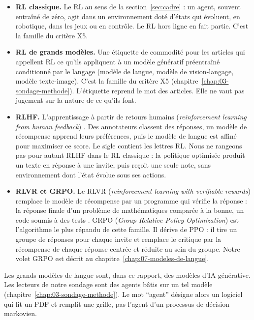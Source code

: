 \begin{itemize}
  \item \textbf{RL classique.} Le RL au sens de la section~\ref{sec:cadre} : un agent, souvent entraîné de
  zéro, agit dans un environnement doté d'états qui évoluent, en robotique, dans les jeux ou en
  contrôle. Le RL hors ligne en fait partie. C'est la famille  du critère X5.
  \item \textbf{RL de grands modèles.} Une étiquette de commodité pour les articles qui appellent RL ce
  qu'ils appliquent à un modèle génératif préentraîné conditionné par le langage (modèle de langue,
  modèle de vision-langage, modèle texte-image). C'est la famille  du critère X5
  (chapitre~\ref{chap:03-sondage-methode}). L'étiquette reprend le mot des articles. Elle ne vaut pas jugement
  sur la nature de ce qu'ils font.
  \item \textbf{RLHF.} L'apprentissage à partir de retours humains (\emph{reinforcement learning from
  human feedback}) \parencite{christiano2017deep,ouyang2022instructgpt}. Des annotateurs classent des
  réponses, un modèle de récompense apprend leurs préférences, puis le modèle de langue est affiné pour
  maximiser ce score. Le sigle contient les lettres RL. Nous ne rangeons pas pour autant RLHF dans
  le RL classique : la politique optimisée produit un texte en réponse à une invite, puis reçoit une seule note,
  sans environnement dont l'état évolue sous ses actions.
  \item \textbf{RLVR et GRPO.} Le RLVR (\emph{reinforcement learning with verifiable rewards}) remplace
  le modèle de récompense par un programme qui vérifie la réponse : la réponse finale d'un problème de
  mathématiques comparée à la bonne, un code soumis à des tests \parencite{deepseek2025r1}. GRPO
  (\emph{Group Relative Policy Optimization}) \parencite{shao2024deepseekmath} est l'algorithme le plus
  répandu de cette famille. Il dérive de PPO : il tire un groupe de réponses pour chaque invite et
  remplace le critique par la récompense de chaque réponse centrée et réduite au sein du groupe. Notre
  volet GRPO est décrit au chapitre~\ref{chap:07-modeles-de-langue}.
\end{itemize}

Les grands modèles de langue sont, dans ce rapport, des modèles d'IA générative. Les lecteurs de notre
sondage sont des agents bâtis sur un tel modèle (chapitre~\ref{chap:03-sondage-methode}). Le mot \enquote{agent}
désigne alors un logiciel qui lit un PDF et remplit une grille, pas l'agent d'un processus de décision
markovien.
